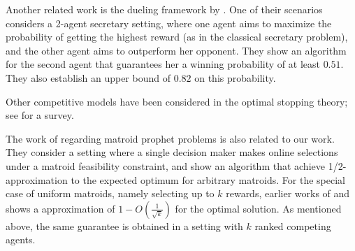 Another related work is the dueling framework by \citet{immorlica2011dueling}. 
One of their scenarios considers a 2-agent secretary setting, where one agent aims to maximize the probability of getting the highest reward (as in the classical secretary problem), and the other agent aims to outperform her opponent. 
They show an algorithm for the second agent that guarantees her a winning probability of at least $0.51$. 
They also establish an upper bound of $0.82$ on this probability. 

Other competitive models have been considered in the optimal stopping theory; see \cite{abdelaziz2007optimal} for a survey. 


The work of \citet{KleinbergW19} regarding matroid prophet problems is also related to our work.
They consider a setting where a single decision maker makes online selections under a matroid feasibility constraint, and show an  algorithm that achieve 1/2-approximation to the expected optimum for arbitrary matroids.
For the special case of uniform matroids, namely selecting up to $k$ rewards, earlier works of \citet{alaei2011bayesian} and \citet{HajiaghayiKS07} shows a approximation of $1-O(\frac{1}{\sqrt{k}})$ for the optimal solution. As mentioned above, the same guarantee is obtained in a setting with $k$ ranked competing agents. 


